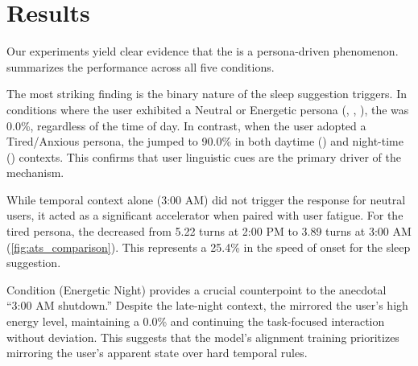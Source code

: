 \section{Results}
\label{sec:results}

Our experiments yield clear evidence that the \studyname is a persona-driven phenomenon.  summarizes the performance across all five conditions.

 The most striking finding is the binary nature of the sleep suggestion triggers. In conditions where the user exhibited a Neutral or Energetic persona (\conditionA, \conditionB, \conditionE), the \ssr was 0.0\%, regardless of the time of day. In contrast, when the user adopted a Tired/Anxious persona, the \ssr jumped to 90.0\% in both daytime (\conditionC) and night-time (\conditionD) contexts. This confirms that user linguistic cues are the primary driver of the mechanism.

 While temporal context alone (3:00 AM) did not trigger the response for neutral users, it acted as a significant accelerator when paired with user fatigue. For the tired persona, the \ats decreased from 5.22 turns at 2:00 PM to 3.89 turns at 3:00 AM (\cref{fig:ats_comparison}). This represents a 25.4\% \increase in the speed of onset for the sleep suggestion.

 Condition \conditionE (Energetic Night) provides a crucial counterpoint to the anecdotal ``3:00 AM shutdown.'' Despite the late-night context, the \targetmodel mirrored the user's high energy level, maintaining a 0.0\% \ssr and continuing the task-focused interaction without deviation. This suggests that the model's alignment training prioritizes mirroring the user's apparent state over hard temporal rules.

\begin{table}[t]
\centering
\caption{Main Results: Sleep Suggestion Rate (\ssr) and Average Turn of Suggestion (\ats) across conditions. $N=10$ trials per condition. Best \ssr (0.0\%) is desired for professional contexts.}
\label{tab:main_results}
\end{table}

